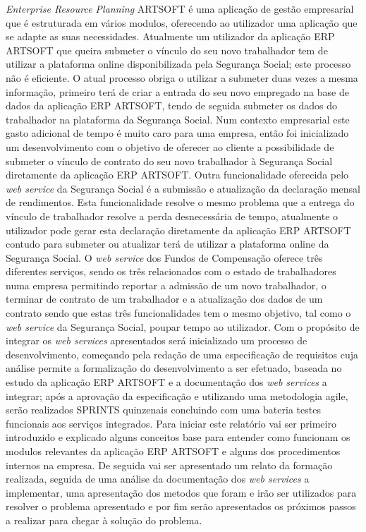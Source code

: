 \documentclass[sigplan]{acmart}
\begin{document}
\textit{Enterprise Resource Planning} ARTSOFT é uma aplicação de gestão empresarial que é estruturada em vários modulos, oferecendo ao utilizador uma aplicação que se adapte as suas necessidades. Atualmente um utilizador da aplicação ERP ARTSOFT que queira submeter o vínculo do seu novo trabalhador tem de utilizar a plataforma online disponibilizada pela Segurança Social; este processo não é eficiente. O atual processo obriga o utilizar a submeter duas vezes a mesma informação, primeiro terá de criar a entrada do seu novo empregado na base de dados da aplicação ERP ARTSOFT, tendo de seguida submeter os dados do trabalhador na plataforma da Segurança Social. Num contexto empresarial este gasto adicional de tempo é muito caro para uma empresa, então foi inicializado um desenvolvimento com o objetivo de oferecer ao cliente a possibilidade de submeter o vínculo de contrato do seu novo trabalhador à Segurança Social diretamente da aplicação ERP ARTSOFT. Outra funcionalidade oferecida pelo \textit{web service} da Segurança Social é a submissão e atualização da declaração mensal de rendimentos. Esta funcionalidade resolve o mesmo problema que a entrega do vínculo de trabalhador resolve a perda desnecessária de tempo, atualmente o utilizador pode gerar esta declaração diretamente da aplicação ERP ARTSOFT contudo para submeter ou atualizar terá de utilizar a plataforma online da Segurança Social. O \textit{web service} dos Fundos de Compensação oferece três diferentes serviços, sendo os três relacionados com o estado de trabalhadores numa empresa permitindo reportar a admissão de um novo trabalhador, o terminar de contrato de um trabalhador e a atualização dos dados de um contrato sendo que estas três funcionalidades tem o mesmo objetivo, tal como o \textit{web service} da Segurança Social, poupar tempo ao utilizador. Com o propósito de integrar os \textit{web services} apresentados será inicializado um processo de desenvolvimento, começando pela redação de uma especificação de requisitos cuja análise permite a formalização do desenvolvimento a ser efetuado, baseada no estudo da aplicação ERP ARTSOFT e a documentação dos \textit{web services} a integrar; após a aprovação da especificação e utilizando uma metodologia agile, serão realizados SPRINTS quinzenais concluindo com uma bateria testes funcionais aos serviços integrados. Para iniciar este relatório vai ser primeiro introduzido e explicado alguns conceitos base para entender como funcionam os modulos relevantes da aplicação ERP ARTSOFT e alguns dos procedimentos internos na empresa. De seguida vai ser apresentado um relato da formação realizada, seguida de uma análise da documentação dos \textit{web services} a implementar, uma apresentação dos metodos que foram e irão ser utilizados para resolver o problema apresentado e por fim serão apresentados os próximos passos a realizar para chegar à solução do problema.
\end{document}
